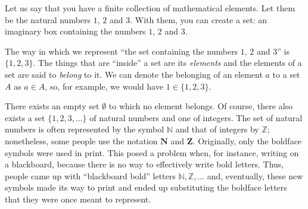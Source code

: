 \begin{para}
Let us say that you have a finite collection of mathematical elements.
Let them be the natural numbers $1$, $2$ and $3$.
With them, you can create a set: an imaginary box containing the numbers $1$, $2$ and $3$.

The way in which we represent ``the set containing the numbers $1$, $2$ and $3$'' is $\{1, 2, 3\}$.
The things that are ``inside'' a set are its \emph{elements} and the elements of a set are said to \emph{belong} to it.
We can denote the belonging of an element $a$ to a set $A$ as $a\in A$, so, for example, we would have $1\in\{1,2,3\}$.

There exists an empty set $\emptyset$ to which no element belongs.
Of course, there also exists a set $\{1,2,3,\ldots\}$ of natural numbers and one of integers. 
The set of natural numbers is often represented by the symbol $\mathbb{N}$ and that of integers by $\mathbb{Z}$; nonetheless, some people use the notation $\mathbf{N}$ and $\mathbf{Z}$.
Originally, only the boldface symbols were used in print.
This posed a problem when, for instance, writing on a blackboard, because there is no way to effectively write bold letters.
Thus, people came up with ``blackboard bold'' letters $\mathbb{N},\mathbb{Z},\ldots$ and, eventually, these new symbols made its way to print and ended up substituting the boldface letters that they were once meant to represent.
\end{para}

